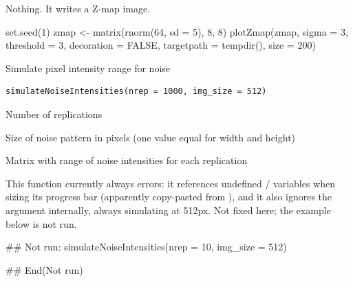 \documentclass[letterpaper]{book}
\begin{document}
%
\begin{Value}
Nothing. It writes a Z-map image.
\end{Value}
%
\begin{Examples}
\begin{ExampleCode}
set.seed(1)
zmap <- matrix(rnorm(64, sd = 5), 8, 8)
plotZmap(zmap, sigma = 3, threshold = 3, decoration = FALSE,
         targetpath = tempdir(), size = 200)
\end{ExampleCode}
\end{Examples}
%
\begin{Description}
Simulate pixel intensity range for noise
\end{Description}
%
\begin{Usage}
\begin{verbatim}
simulateNoiseIntensities(nrep = 1000, img_size = 512)
\end{verbatim}
\end{Usage}
%
\begin{Arguments}
\begin{ldescription}
\item[\code{nrep}] Number of replications

\item[\code{img\_size}] Size of noise pattern in pixels (one value equal for width and height)
\end{ldescription}
\end{Arguments}
%
\begin{Value}
Matrix with range of noise intensities for each replication
\end{Value}
%
\begin{Note}
This function currently always errors: it references undefined /
variables when sizing its progress bar (apparently copy-pasted from ),
and it also ignores the  argument internally, always simulating at 512px. Not fixed
here; the example below is not run.
\end{Note}
%
\begin{Examples}
\begin{ExampleCode}
## Not run: 
simulateNoiseIntensities(nrep = 10, img_size = 512)

## End(Not run)
\end{ExampleCode}
\end{Examples}
\printindex{}
\end{document}

